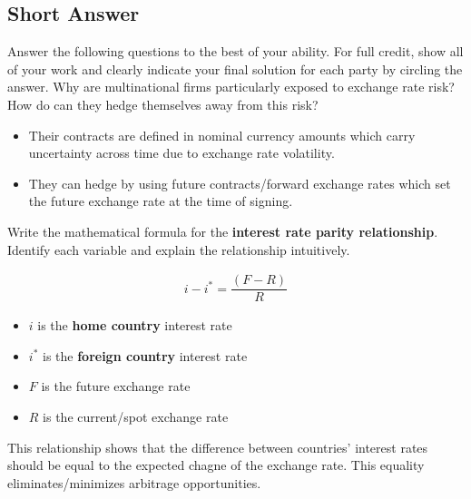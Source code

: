 \documentclass[12pt]{exam}
\begin{document}
\begin{questions}
\newpage
\section*{Short Answer}
Answer the following questions to the best of your ability.
For full credit, show all of your work and clearly indicate your final solution for each party by circling the answer.
\question[5]
Why are multinational firms particularly exposed to exchange rate risk?
How do can they hedge themselves away from this risk?
\begin{solution}
    \begin{itemize}
        \item Their contracts are defined in nominal currency amounts which carry uncertainty across time due to exchange rate volatility.
        \item They can hedge by using future contracts/forward exchange rates which set the future exchange rate at the time of signing.
    \end{itemize}
\end{solution}

\question[5]
Write the mathematical formula for the \textbf{interest rate parity relationship}.
Identify each variable and explain the relationship intuitively.
\begin{solution}
    \begin{align*}
        i - i^{*} = \dfrac{(F - R)}{R}
    \end{align*}
    \begin{itemize}
        \item $i$ is the \textbf{home country} interest rate
        \item $i^{*}$ is the \textbf{foreign country} interest rate
        \item $F$ is the future exchange rate
        \item $R$ is the current/spot exchange rate
    \end{itemize}
    This relationship shows that the difference between countries' interest rates should be equal to the expected chagne of the exchange rate. 
    This equality eliminates/minimizes arbitrage opportunities.
\end{solution}


\end{questions}
\end{document}
